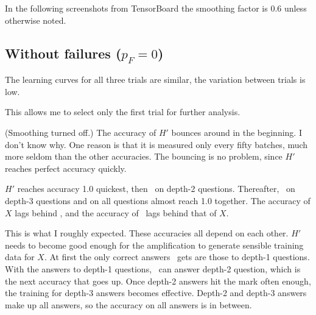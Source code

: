 \documentclass{farlamp}
\begin{document}
In the following screenshots from TensorBoard the smoothing factor is 0.6 unless
otherwise noted.

\subsection{Without failures ($p_F = 0$)}

\begin{LCRow}
\end{LCRow}

\Obs The learning curves for all three trials are similar, the variation between
trials is low.

\Disc This allows me to select only the first trial for further analysis.

\begin{LCRow}
\end{LCRow}

\Obs (Smoothing turned off.) The accuracy of $H'$ bounces around in the
beginning.
\Disc I don't know why. One reason is that it is measured only every fifty
batches, much more seldom than the other accuracies. The bouncing is no problem,
since $H'$ reaches perfect accuracy quickly.

\begin{LCRow}
\end{LCRow}

\Obs $H'$ reaches accuracy 1.0 quickest, then \AmpHp\ on depth-2 questions.
Thereafter, \AmpHp\ on depth-3 questions and on all questions almost reach 1.0
together. The accuracy of $X$ lags behind \AmpHp, and the accuracy of \Xpa\ lags
behind that of $X$.

\Disc This is what I roughly expected. These accuracies all depend on each
other. $H'$ needs to become good enough for the amplification to generate
sensible training data for $X$. At first the only correct answers \AmpHp\ gets
are those to depth-1 questions. With the answers to depth-1 questions, \AmpHp\
can answer depth-2 question, which is the next accuracy that goes up. Once
depth-2 answers hit the mark often enough, the training for depth-3 answers
becomes effective. Depth-2 and depth-3 answers make up all answers, so the
accuracy on all answers is in between.
\end{document}
